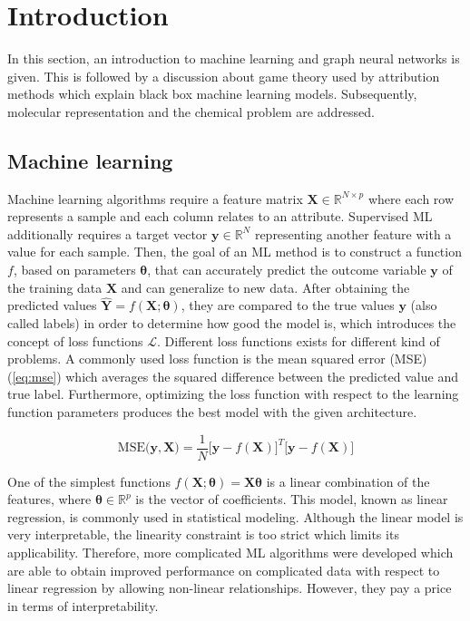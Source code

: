 \chapter{Introduction}


In this section, an introduction to machine learning and graph neural networks is given. 
This is followed by a discussion about game theory used by attribution methods 
which explain black box machine learning models. Subsequently, molecular representation
and the chemical problem are addressed.


\section{Machine learning}


Machine learning algorithms require a feature matrix $\mathbf{X} \in \mathbb{R}^{N \times p}$
where each row represents a sample and each column relates to an attribute. 
Supervised ML additionally requires a target vector $\pmb{y} \in \mathbb{R}^N$
representing another feature with a value for each sample. Then, the goal of an ML method is 
to construct a function $f$, based on parameters $\pmb{\theta}$, that can accurately 
predict the outcome variable $\pmb{y}$ of the training data $\pmb{X}$ and can 
generalize to new data.\cite{hastie2009elements} After obtaining the predicted 
values $\hat{\pmb{Y}} = f\left(\pmb{X}; \pmb{\theta}\right)$, they are compared 
to the true values $\pmb{y}$ (also called labels)
in order to determine how good the model is, which introduces the concept of loss functions $\mathcal{L}$.
Different loss functions exists for different kind of problems.\cite{wang2020comprehensive}
A commonly used loss function is the mean squared error (MSE) (\cref{eq:mse})
which averages the squared difference between the predicted value and true label.
Furthermore, optimizing the loss function with respect to the learning function
parameters produces the best model with the given architecture.\cite{hastie2009elements}


\begin{equation}
	\label{eq:mse}
	\text{MSE}\big(\pmb{y}, \pmb{X}\big) = \frac{1}{N}  \big[\pmb{y} - f(\mathbf{X})\big]^T[\pmb{y} - f(\mathbf{X})\big]
\end{equation}


One of the simplest functions $f\left(\mathbf{X}; \pmb{\theta}\right) = \mathbf{X}\pmb{\theta}$
is a linear combination of the features, where $\pmb{\theta} \in \mathbb{R}^p$
is the vector of coefficients. This model, known as linear regression, is commonly
used in statistical modeling.\cite{kutner2005applied} Although the linear model is
very interpretable, the linearity constraint is too strict which limits its
applicability. Therefore, more complicated ML algorithms were developed which are
able to obtain improved performance on complicated data with respect to linear
regression by allowing non-linear relationships.\cite{deng2012mnist} However,
they pay a price in terms of interpretability.\cite{fan2021interpretability}


